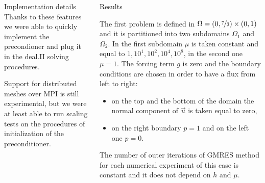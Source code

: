 \documentclass[final]{beamer}
\newlength{\onecolwid}
\begin{document}
\begin{frame}[t]
\begin{columns}[t]
\begin{column}{\onecolwid}
\begin{block}{Implementation details}
Thanks to these features we were able to quickly implement the precondioner
and plug it in the deal.II solving procedures.

Support for distributed meshes over MPI is still experimental, but we were at
least able to run scaling tests on the procedures of initialization of the
preconditioner.

\end{block}


\end{column} %


\begin{column}{\onecolwid} %

\begin{block}{Results}

The first problem is defined in $\Omega = (0,\nicefrac{7}{3}) \times (0,1)$ and
it is partitioned into two subdomains $\Omega_1$ and $\Omega_2$. In the first subdomain $\mu$ is taken
constant and equal to $1, 10^{1}, 10^{2}, 10^{4}, 10^{8}$, in the second one
$\mu=1$. The forcing term $g$ is zero and the boundary conditions are chosen in
order to have a  flux from left to right:
\begin{itemize}
  \item on the top and the bottom of the domain the normal component of
    $\vec{u}$ is taken equal to zero,
  \item on the right boundary $p=1$ and on the left one $p=0$.
\end{itemize}

\begin{figure}
    \begin{tikzpicture}[scale=2.5,font=\small]
        
    \end{tikzpicture}
\end{figure}

The number of outer iterations of GMRES method for each numerical experiment of
this case is constant and it does not depend on $h$ and $\mu$.

\begin{table}
    {\footnotesize }
\end{table}

\end{block}

\end{column} %


\end{columns}
\end{frame}
\end{document}

